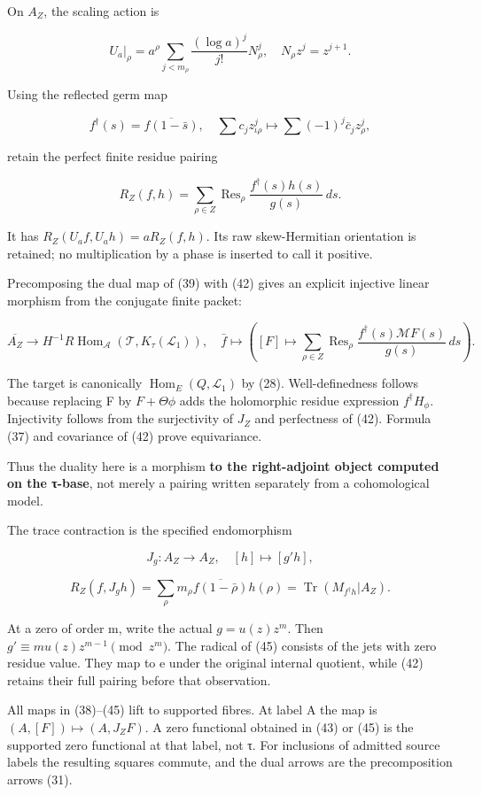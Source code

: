 On \(A_Z\), the scaling action is

\[
U_a|_\rho=a^\rho\sum_{j<m_\rho}\frac{(\log a)^j}{j!}N_\rho^j,
\quad N_\rho z^j=z^{j+1}.
\tag{40}
\]

Using the reflected germ map

\[
f^\dagger(s)=\overline{f(1-\bar s)},
\quad
\sum c_jz_{\iota\rho}^j\mapsto\sum(-1)^j\bar c_jz_\rho^j,
\tag{41}
\]

retain the perfect finite residue pairing

\[
R_Z(f,h)=\sum_{\rho\in Z}\operatorname{Res}_\rho
\frac{f^\dagger(s)h(s)}{g(s)}\,ds.
\tag{42}
\]

It has \(R_Z(U_af,U_ah)=aR_Z(f,h)\). Its raw skew-Hermitian orientation is retained; no multiplication by a phase is inserted to call it positive.

Precomposing the dual map of (39) with (42) gives an explicit injective linear morphism from the conjugate finite packet:

\[
\boxed{
\overline{A_Z}\longrightarrow
H^{-1}R\operatorname{Hom}_{\mathcal A}(\mathcal T,K_\tau(\mathcal L_1)),
\quad
\bar f\longmapsto
\left([F]\longmapsto\sum_{\rho\in Z}\operatorname{Res}_\rho
\frac{f^\dagger(s)\mathcal MF(s)}{g(s)}\,ds\right).
}
\tag{43}
\]

The target is canonically \(\operatorname{Hom}_E(Q,\mathcal L_1)\) by (28). Well-definedness follows because replacing F by \(F+\Theta\phi\) adds the holomorphic residue expression \(f^\dagger H_\phi\). Injectivity follows from the surjectivity of \(J_Z\) and perfectness of (42). Formula (37) and covariance of (42) prove equivariance.

Thus the duality here is a morphism \textbf{to the right-adjoint object computed on the τ-base}, not merely a pairing written separately from a cohomological model.

The trace contraction is the specified endomorphism

\[
J_g:A_Z\to A_Z,\quad[h]\mapsto[g'h],
\tag{44}
\]

\[
R_Z(f,J_gh)=\sum_\rho m_\rho\overline{f(1-\bar\rho)}h(\rho)
=\operatorname{Tr}(M_{f^\dagger h}|A_Z).
\tag{45}
\]

At a zero of order m, write the actual \(g=u(z)z^m\). Then \(g'\equiv m u(z)z^{m-1}\pmod{z^m}\). The radical of (45) consists of the jets with zero residue value. They map to e under the original internal quotient, while (42) retains their full pairing before that observation.

All maps in (38)--(45) lift to supported fibres. At label A the map is \((A,[F])\mapsto(A,J_ZF)\). A zero functional obtained in (43) or (45) is the supported zero functional at that label, not τ. For inclusions of admitted source labels the resulting squares commute, and the dual arrows are the precomposition arrows (31).

